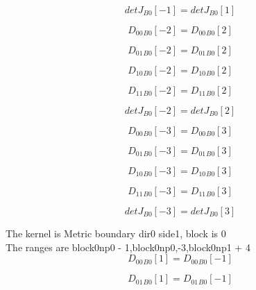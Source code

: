 \documentclass{article}
\begin{document}
\begin{dmath}{detJ{_{B0}}}[{-1}] = {detJ{_{B0}}}[{1}]\end{dmath}

\begin{dmath}{D_{00}{_{B0}}}[{-2}] = {D_{00}{_{B0}}}[{2}]\end{dmath}

\begin{dmath}{D_{01}{_{B0}}}[{-2}] = {D_{01}{_{B0}}}[{2}]\end{dmath}

\begin{dmath}{D_{10}{_{B0}}}[{-2}] = {D_{10}{_{B0}}}[{2}]\end{dmath}

\begin{dmath}{D_{11}{_{B0}}}[{-2}] = {D_{11}{_{B0}}}[{2}]\end{dmath}

\begin{dmath}{detJ{_{B0}}}[{-2}] = {detJ{_{B0}}}[{2}]\end{dmath}

\begin{dmath}{D_{00}{_{B0}}}[{-3}] = {D_{00}{_{B0}}}[{3}]\end{dmath}

\begin{dmath}{D_{01}{_{B0}}}[{-3}] = {D_{01}{_{B0}}}[{3}]\end{dmath}

\begin{dmath}{D_{10}{_{B0}}}[{-3}] = {D_{10}{_{B0}}}[{3}]\end{dmath}

\begin{dmath}{D_{11}{_{B0}}}[{-3}] = {D_{11}{_{B0}}}[{3}]\end{dmath}

\begin{dmath}{detJ{_{B0}}}[{-3}] = {detJ{_{B0}}}[{3}]\end{dmath}

\noindent The kernel is Metric boundary dir0 side1, block is 0\\\noindent The ranges are block0np0 - 1,block0np0,-3,block0np1 + 4\\\begin{dmath}{D_{00}{_{B0}}}[{1}] = {D_{00}{_{B0}}}[{-1}]\end{dmath}

\begin{dmath}{D_{01}{_{B0}}}[{1}] = {D_{01}{_{B0}}}[{-1}]\end{dmath}
\end{document}
